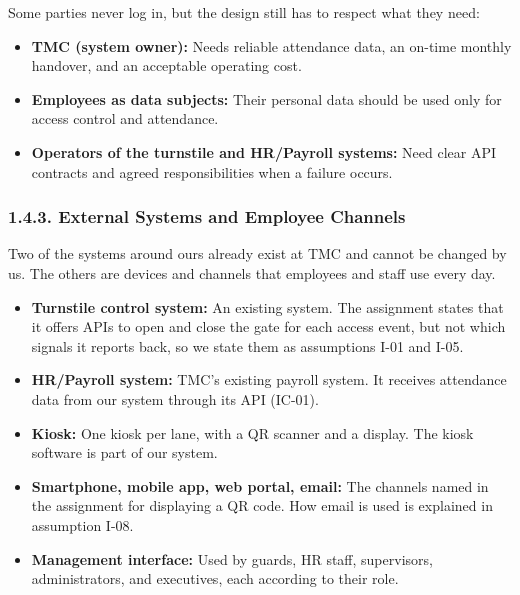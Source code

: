 {}

Some parties never log in, but the design still has to respect what they need:

\begin{itemize}[leftmargin=36pt, itemsep=2pt, topsep=4pt, parsep=2pt]
  \item \textbf{TMC (system owner):} Needs reliable attendance data, an on-time monthly handover, and an acceptable operating cost.
  \item \textbf{Employees as data subjects:} Their personal data should be used only for access control and attendance.
  \item \textbf{Operators of the turnstile and HR/Payroll systems:} Need clear API contracts and agreed responsibilities when a failure occurs.
\end{itemize}

\subsubsection*{1.4.3. External Systems and Employee Channels}

{}

Two of the systems around ours already exist at TMC and cannot be changed by us. The others are devices and channels that employees and staff use every day.

\begin{itemize}[leftmargin=36pt, itemsep=2pt, topsep=4pt, parsep=2pt]
  \item \textbf{Turnstile control system:} An existing system. The assignment states that it offers APIs to open and close the gate for each access event, but not which signals it reports back, so we state them as assumptions I-01 and I-05.
  \item \textbf{HR/Payroll system:} TMC's existing payroll system. It receives attendance data from our system through its API (IC-01).
  \item \textbf{Kiosk:} One kiosk per lane, with a QR scanner and a display. The kiosk software is part of our system.
  \item \textbf{Smartphone, mobile app, web portal, email:} The channels named in the assignment for displaying a QR code. How email is used is explained in assumption I-08.
  \item \textbf{Management interface:} Used by guards, HR staff, supervisors, administrators, and executives, each according to their role.
\end{itemize}

